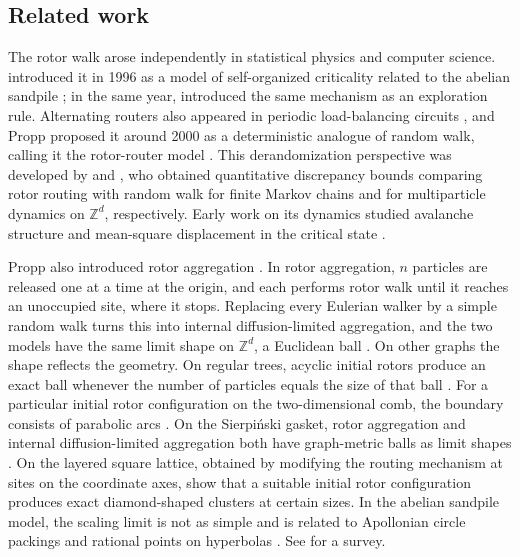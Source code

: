 \documentclass[11pt]{amsart}
\theoremstyle{plain}
\theoremstyle{definition}
\newcommand{\Z}{\mathbb Z}
\begin{document}
	\subsection{Related work}\label{ssec:related-work}  The rotor walk arose independently in statistical physics and computer science.
	\citet*{PriezzhevDharDharKrishnamurthy1996} introduced it in 1996 as a model
	of self-organized criticality related to the abelian sandpile
	\citep{BakTangWiesenfeld1987,Dhar1990}; in the same year,
	\citet*{WagnerLindenbaumBruckstein1996} introduced the same mechanism as an
	exploration rule.  Alternating routers also appeared in periodic load-balancing circuits \citep{RabaniSinclairWanka1998},
	and Propp proposed it around 2000 as a deterministic analogue
	of random walk, calling it the rotor-router model
	\citep{Propp2003,Propp2010}.  This derandomization perspective was developed
	by \citet{HolroydPropp2010} and \citet{CooperSpencer2006}, who obtained
	quantitative discrepancy bounds comparing rotor routing with random walk for
	finite Markov chains and for multiparticle dynamics on $\Z^d$, respectively.
	Early work on its dynamics studied avalanche structure and mean-square displacement in the critical state
	\citep{PovolotskyPriezzhevShcherbakov1998}.
	
	
	Propp also introduced rotor aggregation \citep{Propp2003}.   In rotor
	aggregation, $n$ particles are released one at a time at the origin, and each
	performs rotor walk until it reaches an unoccupied site, where it stops.
	Replacing every Eulerian walker by a simple random walk turns this into internal diffusion-limited aggregation, and the two models have the same
	limit shape on $\Z^d$, a Euclidean ball \citep{LawlerBramsonGriffeath1992,LevinePeres2009}.  On other graphs the shape reflects the geometry.  On
	regular trees, acyclic initial rotors produce an exact ball whenever the number
	of particles equals the size of that ball \citep{LandauLevine2009}.  For a
	particular initial rotor configuration on the two-dimensional comb, the boundary
	consists of parabolic arcs \citep{HussSava2011}.  On the Sierpi\'nski gasket,
	rotor aggregation and internal diffusion-limited aggregation both have
	graph-metric balls as limit shapes
	\citep{ChenKudlerFlam2020,ChenHussSavaHussTeplyaev2020}.  On the layered square lattice, obtained by
	modifying the routing mechanism at sites on the coordinate axes,
	\citet{KagerLevine2010} show that a suitable initial rotor configuration
	produces exact diamond-shaped clusters at certain sizes.  In the  abelian sandpile model, the scaling limit is not as simple
	\citep{PegdenSmart2013,BouRabee2021,BouRabee2024Shape} and is related to
	Apollonian circle packings \citep{LevinePegdenSmart2016,LevinePegdenSmart2017}
	and rational points on hyperbolas \citep{BouRabee2024FLattice}. See \citet{LevinePeres2017} for a survey.
	
\end{document}
